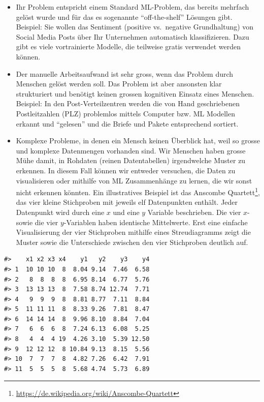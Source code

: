 \documentclass[
]{book}
\providecommand{\tightlist}{%
  \setlength{\itemsep}{0pt}\setlength{\parskip}{0pt}}
\begin{document}
\begin{itemize}
\tightlist
\item
  Ihr Problem entspricht einem Standard ML-Problem, das bereits mehrfach gelöst wurde und für das es sogenannte ``off-the-shelf'' Lösungen gibt. Beispiel: Sie wollen das Sentiment (positive vs.~negative Grundhaltung) von Social Media Posts über Ihr Unternehmen automatisch klassifizieren. Dazu gibt es viele vortrainierte Modelle, die teilweise gratis verwendet werden können.
\item
  Der manuelle Arbeitsaufwand ist sehr gross, wenn das Problem durch Menschen gelöst werden soll. Das Problem ist aber ansonsten klar strukturiert und benötigt keinen grossen kognitiven Einsatz eines Menschen. Beispiel: In den Post-Verteilzentren werden die von Hand geschriebenen Postleitzahlen (PLZ) problemlos mittels Computer bzw. ML Modellen erkannt und ``gelesen'' und die Briefe und Pakete entsprechend sortiert.
\item
  Komplexe Probleme, in denen ein Mensch keinen Überblick hat, weil so grosse und komplexe Datenmengen vorhanden sind. Wir Menschen haben grosse Mühe damit, in Rohdaten (reinen Datentabellen) irgendwelche Muster zu erkennen. In diesem Fall können wir entweder versuchen, die Daten zu visualisieren oder mithilfe von ML Zusammenhänge zu lernen, die wir sonst nicht erkennen könnten. Ein illustratives Beispiel ist das Anscombe Quartett\footnote{\url{https://de.wikipedia.org/wiki/Anscombe-Quartett}}, das vier kleine Stichproben mit jeweils elf Datenpunkten enthält. Jeder Datenpunkt wird durch eine \(x\) und eine \(y\) Variable beschrieben. Die vier \(x\)- sowie die vier \(y\)-Variablen haben identische Mittelwerte. Erst eine einfache Visualisierung der vier Stichproben mithilfe eines Streudiagramms zeigt die Muster sowie die Unterschiede zwischen den vier Stichproben deutlich auf.
\end{itemize}

\begin{verbatim}
#>    x1 x2 x3 x4    y1   y2    y3    y4
#> 1  10 10 10  8  8.04 9.14  7.46  6.58
#> 2   8  8  8  8  6.95 8.14  6.77  5.76
#> 3  13 13 13  8  7.58 8.74 12.74  7.71
#> 4   9  9  9  8  8.81 8.77  7.11  8.84
#> 5  11 11 11  8  8.33 9.26  7.81  8.47
#> 6  14 14 14  8  9.96 8.10  8.84  7.04
#> 7   6  6  6  8  7.24 6.13  6.08  5.25
#> 8   4  4  4 19  4.26 3.10  5.39 12.50
#> 9  12 12 12  8 10.84 9.13  8.15  5.56
#> 10  7  7  7  8  4.82 7.26  6.42  7.91
#> 11  5  5  5  8  5.68 4.74  5.73  6.89
\end{verbatim}
\end{document}

